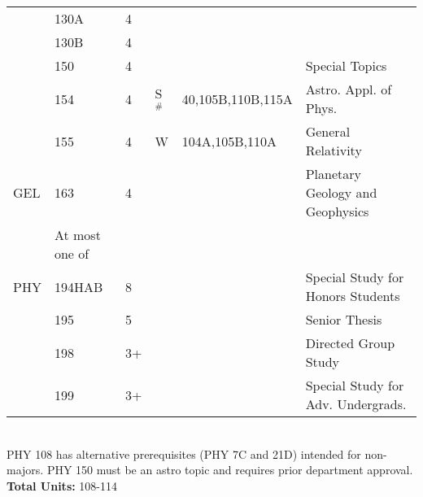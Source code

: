 \documentclass[12pt]{article}
\begin{document}
\begin{tabular}{|llllll|}
    & 130A & 4 &  &  & \\  
    & 130B & 4 &  &  & \\  
    & 150  & 4 &  &  & Special Topics\\  
    & 154  & 4 & S$^\#$ & 40,105B,110B,115A & Astro. Appl. of Phys. \\
    & 155  & 4 & W   & 104A,105B,110A & General Relativity \\ 
GEL & 163  & 4 &  &  & Planetary Geology and Geophysics\\ 
 & At most one of &  &  &  & \\ 
PHY & 194HAB & 8 &  &  & Special Study for Honors Students\\ 
    & 195  & 5 &  &  & Senior Thesis\\
    & 198  & 3+ &  &  & Directed Group Study\\ 
    & 199  & 3+ &  &  & Special Study for Adv. Undergrads.\\ 
\hline
\end{tabular}\\
\vskip 0.25cm
\noindent
PHY 108 has alternative prerequisites (PHY 7C and 21D)
intended for non-majors.  PHY 150 must be an astro topic and requires
prior department approval.\\
\noindent
{\bf Total Units:} 108-114 \\
\end{document}
